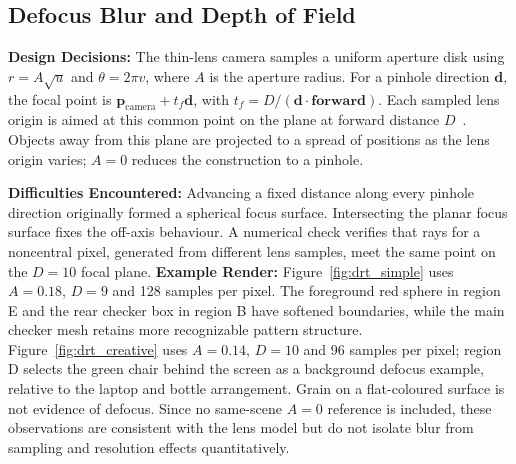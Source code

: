 \documentclass[11pt,a4paper]{article}
\begin{document}
\subsection{Defocus Blur and Depth of Field}
\textbf{Design Decisions:} The thin-lens camera samples a uniform aperture disk using \(r=A\sqrt{u}\) and \(\theta=2\pi v\), where $A$ is the aperture radius. For a pinhole direction $\mathbf{d}$, the focal point is \(\mathbf{p}_{\mathrm{camera}}+t_f\mathbf{d}\), with \(t_f=D/(\mathbf{d}\cdot\mathbf{forward})\). Each sampled lens origin is aimed at this common point on the plane at forward distance $D$~\cite[Ch.~11, pp.~37--39]{shirley2018}. Objects away from this plane are projected to a spread of positions as the lens origin varies; $A=0$ reduces the construction to a pinhole.

\textbf{Difficulties Encountered:} Advancing a fixed distance along every pinhole direction originally formed a spherical focus surface. Intersecting the planar focus surface fixes the off-axis behaviour. A numerical check verifies that rays for a noncentral pixel, generated from different lens samples, meet the same point on the $D=10$ focal plane.
\textbf{Example Render:}
Figure~\ref{fig:drt_simple} uses $A=0.18$, $D=9$ and 128 samples per pixel. The foreground red sphere in region E and the rear checker box in region B have softened boundaries, while the main checker mesh retains more recognizable pattern structure. Figure~\ref{fig:drt_creative} uses $A=0.14$, $D=10$ and 96 samples per pixel; region D selects the green chair behind the screen as a background defocus example, relative to the laptop and bottle arrangement. Grain on a flat-coloured surface is not evidence of defocus. Since no same-scene $A=0$ reference is included, these observations are consistent with the lens model but do not isolate blur from sampling and resolution effects quantitatively.
\end{document}
